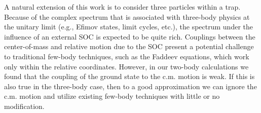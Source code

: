 A natural extension of this work is to consider three particles within a trap.  Because of the complex spectrum that is associated with three-body physics at the unitary limit (e.g., Efimov states, limit cycles, etc.), the spectrum under the influence of an external SOC is expected to be quite rich.  Couplings between the center-of-mass and relative motion due to the SOC present a potential challenge to traditional few-body techniques, such as the Faddeev equations, which work only within the relative coordinates.  However, in our two-body calculations we found that the coupling of the ground state to the c.m. motion is weak. If this is also true in the three-body case, then to a good approximation we can ignore the c.m. motion and utilize existing few-body techniques with little or no modification.  

%
%


